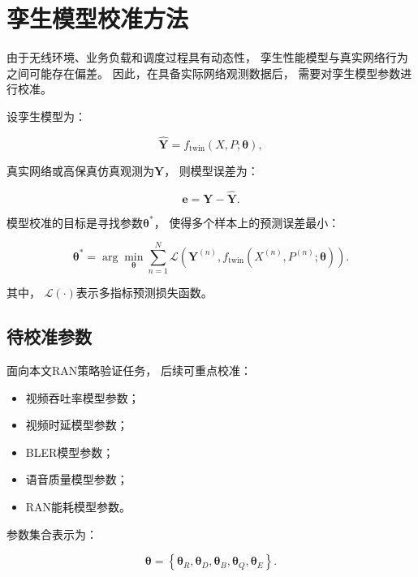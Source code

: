 \documentclass[lang=cn,12pt]{elegantbook}
\begin{document}
\section{孪生模型校准方法}
\label{sec:twin_model_calibration}

由于无线环境、业务负载和调度过程具有动态性，
孪生性能模型与真实网络行为之间可能存在偏差。
因此，在具备实际网络观测数据后，
需要对孪生模型参数进行校准。

设孪生模型为：

\begin{equation}
\hat{\boldsymbol{Y}}
=
f_{\mathrm{twin}}
\left(
X,
P;
\boldsymbol{\theta}
\right),
\label{eq:twin_model_calibration_model}
\end{equation}

真实网络或高保真仿真观测为$\boldsymbol{Y}$，
则模型误差为：

\begin{equation}
\boldsymbol{e}
=
\boldsymbol{Y}
-
\hat{\boldsymbol{Y}}.
\label{eq:twin_model_error}
\end{equation}

模型校准的目标是寻找参数$\boldsymbol{\theta}^{*}$，
使得多个样本上的预测误差最小：

\begin{equation}
\boldsymbol{\theta}^{*}
=
\arg\min_{\boldsymbol{\theta}}
\sum_{n=1}^{N}
\mathcal{L}
\left(
\boldsymbol{Y}^{(n)},
f_{\mathrm{twin}}
\left(
X^{(n)},
P^{(n)};
\boldsymbol{\theta}
\right)
\right).
\label{eq:twin_parameter_calibration}
\end{equation}

其中，
$\mathcal{L}(\cdot)$表示多指标预测损失函数。


\subsection*{待校准参数}

面向本文RAN策略验证任务，
后续可重点校准：

\begin{itemize}
    \item 视频吞吐率模型参数；
    \item 视频时延模型参数；
    \item BLER模型参数；
    \item 语音质量模型参数；
    \item RAN能耗模型参数。
\end{itemize}

参数集合表示为：

\begin{equation}
\boldsymbol{\theta}
=
\left\{
\boldsymbol{\theta}_{R},
\boldsymbol{\theta}_{D},
\boldsymbol{\theta}_{B},
\boldsymbol{\theta}_{Q},
\boldsymbol{\theta}_{E}
\right\}.
\label{eq:twin_calibration_parameters}
\end{equation}
\end{document}
